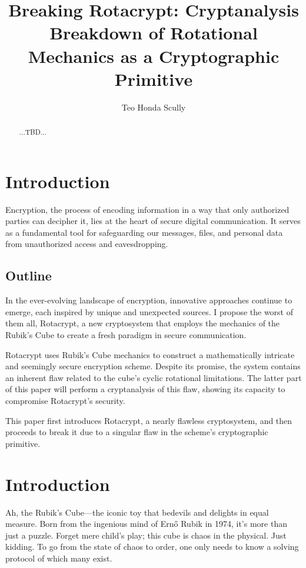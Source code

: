 \documentclass[12pt]{article}
\title{Breaking Rotacrypt: Cryptanalysis Breakdown of Rotational Mechanics as a Cryptographic Primitive}
\author{Teo Honda Scully}
\date{}
\begin{document}
\maketitle

\begin{abstract}
...TBD...
\end{abstract}

\tableofcontents

\newpage

\section{Introduction}

Encryption, the process of encoding information in a way that only authorized parties can decipher it, lies at the heart of secure digital communication. It serves as a fundamental tool for safeguarding our messages, files, and personal data from unauthorized access and eavesdropping.

\subsection{Outline}

In the ever-evolving landscape of encryption, innovative approaches continue to emerge, each inspired by unique and unexpected sources. I propose the worst of them all, Rotacrypt, a new cryptosystem that employs the mechanics of the Rubik's Cube to create a fresh paradigm in secure communication.

Rotacrypt uses Rubik's Cube mechanics to construct a mathematically intricate and seemingly secure encryption scheme. Despite its promise, the system contains an inherent flaw related to the cube's cyclic rotational limitations. The latter part of this paper will perform a cryptanalysis of this flaw, showing its capacity to compromise Rotacrypt's security.

This paper first introduces Rotacrypt, a nearly flawless cryptosystem, and then proceeds to break it due to a singular flaw in the scheme's cryptographic primitive.

\section{Introduction}

Ah, the Rubik's Cube—the iconic toy that bedevils and delights in equal measure. Born from the ingenious mind of Ernő Rubik in 1974, it's more than just a puzzle. Forget mere child's play; this cube is chaos in the physical. Just kidding. To go from the state of chaos to order, one only needs to know a solving protocol of which many exist.
\end{document}
